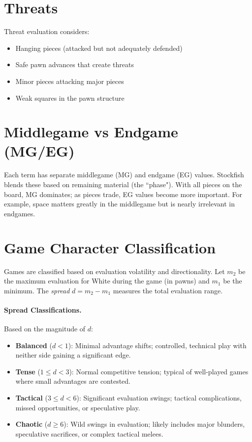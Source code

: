 \documentclass[11pt]{book}
\begin{document}
\section{Threats}

Threat evaluation considers:
\begin{itemize}
\item Hanging pieces (attacked but not adequately defended)
\item Safe pawn advances that create threats
\item Minor pieces attacking major pieces
\item Weak squares in the pawn structure
\end{itemize}

\section{Middlegame vs Endgame (MG/EG)}

Each term has separate middlegame (MG) and endgame (EG) values. Stockfish blends these based on remaining material (the ``phase"). With all pieces on the board, MG dominates; as pieces trade, EG values become more important. For example, space matters greatly in the middlegame but is nearly irrelevant in endgames.

\section{Game Character Classification}

Games are classified based on evaluation volatility and directionality. Let $m_2$ be the maximum evaluation for White during the game (in pawns) and $m_1$ be the minimum. The \emph{spread} $d = m_2 - m_1$ measures the total evaluation range.

\paragraph{Spread Classifications.} Based on the magnitude of $d$:
\begin{itemize}
\item \textbf{Balanced} ($d < 1$): Minimal advantage shifts; controlled, technical play with neither side gaining a significant edge.
\item \textbf{Tense} ($1 \le d < 3$): Normal competitive tension; typical of well-played games where small advantages are contested.
\item \textbf{Tactical} ($3 \le d < 6$): Significant evaluation swings; tactical complications, missed opportunities, or speculative play.
\item \textbf{Chaotic} ($d \ge 6$): Wild swings in evaluation; likely includes major blunders, speculative sacrifices, or complex tactical melees.
\end{itemize}
\end{document}
